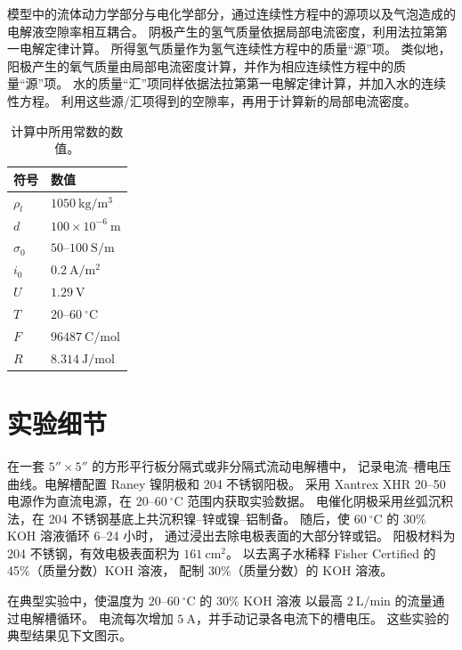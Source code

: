 \documentclass[UTF8,zihao=-4,fontset=fandol]{ctexart}
\begin{document}
模型中的流体动力学部分与电化学部分，通过连续性方程中的源项以及气泡造成的电解液空隙率相互耦合。
阴极产生的氢气质量依据局部电流密度，利用法拉第第一电解定律计算。
所得氢气质量作为氢气连续性方程中的质量“源”项。
类似地，阳极产生的氧气质量由局部电流密度计算，并作为相应连续性方程中的质量“源”项。
水的质量“汇”项同样依据法拉第第一电解定律计算，并加入水的连续性方程。
利用这些源/汇项得到的空隙率，再用于计算新的局部电流密度。

\begin{table}[htbp]
  \centering
  \caption{计算中所用常数的数值。}
  \label{tab:constants}
  \begin{tabular}{>{\centering\arraybackslash}p{3.2cm} p{5.3cm}}
    \toprule
    符号 & 数值\\
    \midrule
    \(\rho_l\) & \(1050~\mathrm{kg/m^3}\)\\
    \(d\) & \(100\times10^{-6}~\mathrm{m}\)\\
    \(\sigma_0\) & \(50\text{--}100~\mathrm{S/m}\)\\
    \(i_0\) & \(0.2~\mathrm{A/m^2}\)\\
    \(U\) & \(1.29~\mathrm{V}\)\\
    \(T\) & \(20\text{--}60~^\circ\mathrm{C}\)\\
    \(F\) & \(96487~\mathrm{C/mol}\)\\
    \(R\) & \(8.314~\mathrm{J/mol}\)\\
    \bottomrule
  \end{tabular}
\end{table}

\section{实验细节}

在一套 \(5''\times5''\) 的方形平行板分隔式或非分隔式流动电解槽中，
记录电流--槽电压曲线。电解槽配置 Raney 镍阴极和 204 不锈钢阳极。
采用 Xantrex XHR 20--50 电源作为直流电源，在 \(20\text{--}60~^\circ\mathrm{C}\) 范围内获取实验数据。
电催化阴极采用丝弧沉积法，在 204 不锈钢基底上共沉积镍--锌或镍--铝制备。
随后，使 \(60~^\circ\mathrm{C}\) 的 30\% KOH 溶液循环 6--24 小时，
通过浸出去除电极表面的大部分锌或铝。
阳极材料为 204 不锈钢，有效电极表面积为 \(161~\mathrm{cm^2}\)。
以去离子水稀释 Fisher Certified 的 45\%（质量分数）KOH 溶液，
配制 30\%（质量分数）的 KOH 溶液。

在典型实验中，使温度为 \(20\text{--}60~^\circ\mathrm{C}\) 的 30\% KOH 溶液
以最高 \(2~\mathrm{L/min}\) 的流量通过电解槽循环。
电流每次增加 \(5~\mathrm{A}\)，并手动记录各电流下的槽电压。
这些实验的典型结果见下文图示。
\end{document}
